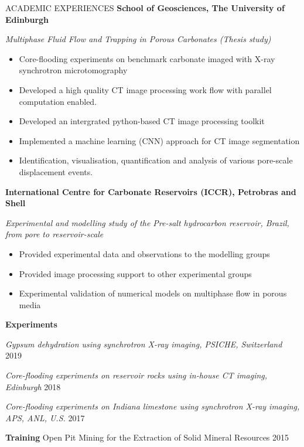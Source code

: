 \documentclass{resume} %
\newenvironment{indentpar}[1]%
  {\begin{list}{}%
          {\setlength{\leftmargin}{#1}}%
          \item[]%
  }
  {\end{list}}
\begin{document}
\begin{rSection}{ACADEMIC EXPERIENCES}
\textbf{School of Geosciences, The University of Edinburgh} 
\begin{indentpar}{0.5cm}
\textit{Multiphase Fluid Flow and Trapping in Porous Carbonates (Thesis study)}
\begin{itemize}
    \item Core-flooding experiments on benchmark carbonate imaged with X-ray synchrotron microtomography
    \item Developed a high quality CT image processing work flow with parallel computation enabled.
    \item Developed an intergrated python-based CT image processing toolkit 
    \item Implemented a machine learning (CNN) approach for CT image segmentation
    \item Identification, visualisation, quantification and analysis of various pore-scale displacement events.
\end{itemize}
\end{indentpar}

\textbf{International Centre for Carbonate Reservoirs (ICCR), Petrobras and Shell} 
\begin{indentpar}{0.5cm}
\textit{Experimental and modelling study of the Pre-salt hydrocarbon reservoir, Brazil, from pore to reservoir-scale}
\begin{itemize}
    \item Provided experimental data and observations to the modelling groups 
    \item Provided image processing support to other experimental groups
    \item Experimental validation of numerical models on multiphase flow in porous media
\end{itemize}
\end{indentpar}
\textbf{Experiments} 

\begin{indentpar}{0.5cm}
\textit{Gypsum dehydration using synchrotron X-ray imaging, PSICHE, Switzerland} \hfill {2019}

\textit{Core-flooding experiments on reservoir rocks using in-house CT imaging, Edinburgh} \hfill {2018}

\textit{Core-flooding experiments on Indiana limestone using synchrotron X-ray imaging, APS, ANL, U.S.} \hfill {2017}
\end{indentpar}

\textbf{Training} Open Pit Mining for the Extraction of Solid Mineral Resources \hfill {2015}

\end{rSection}
\end{document}
